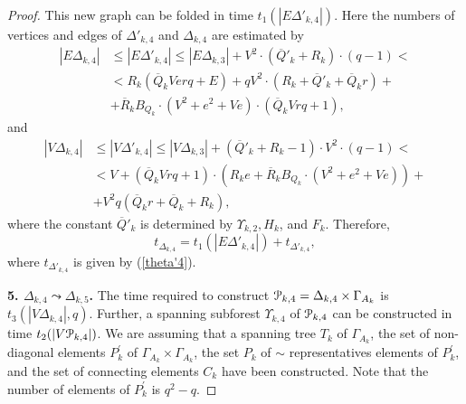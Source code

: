 \documentclass[a4paper,12pt]{article}
\newcommand{\G}{\Gamma }
\newcommand{\D}{\Delta }
\newcommand{\U}{\Upsilon }
\newcommand{\cP}{{\cal{P}}}
\numberwithin{equation}{section}
\numberwithin{figure}{section}
\begin{document}
\begin{proof}
This new graph can be folded in time $t_1(|E\D'_{k,4}|)$. Here the
numbers of vertices and edges of $\D'_{k,4}$ and $\D_{k,4}$ are estimated
by
\begin{equation}\label{etheta4}
\begin{split}
|E\D_{k,4}| &\le |E\D'_{k,4}| \le |E\D_{k,3}|+ V^2 \cdot (\overline{Q}'_k +
R_k)\cdot(q-1)<\\
&< R_k(\overline{Q}_k V e r q + E) + q V^2\cdot (R_k + \overline{Q}'_k + \overline{Q}_k r) +\\
&+ \overline{R}_k B_{Q_k} \cdot(V^2+ e^2 + Ve)\cdot(\overline{Q}_k
V r q +1),
\end{split}
\end{equation}
and
\begin{equation}\label{vtheta4}
\begin{split}
|V\D_{k,4}| &\le |V \D'_{k,4}| \le |V \D_{k,3}| +(\overline{Q}'_k+R_k-1)\cdot
V^2 \cdot(q-1)<\\
&< V + (\overline{Q}_k V rq +1)\cdot(R_k e +\overline{R}_k B_{Q_k}
\cdot(V^2 + e^2 + V e)) +\\
&+ V^2 q (\overline{Q}_k r +\overline{Q}_k +R_k) ,
\end{split}
\end{equation}
where the constant $\overline{Q}'_k$ is determined by $\U_{k,2}, H_k$, and
$F_k$.
Therefore,
\begin{equation}\label{theta4}
t_{\D_{k,4}} = t_1(|E\D'_{k,4}|) + t_{\D'_{k,4}},
\end{equation}
where $t_{\D'_{k,4}}$ is given by (\ref{theta'4}).

{\bf 5. $\D_{k,4} \leadsto \D_{k,5}$.} The time required to construct
$\cP_{k,4}=\D_{k,4}\times \G_{A_k}$ is $t_3(|V \D_{k,4}|, q)$. Further,
 a spanning subforest $\U_{k,4}$ of $\cP_{k,4}$ can be constructed in time
$t_2(|V\cP_{k,4}|)$. We are assuming that  a spanning tree $T_k$ of
$\G_{A_k}$, the set of non-diagonal elements $P_k^\prime$ of
$\G_{A_k}\times \G_{A_k}$, the set $P_k$ of $\sim$ representatives
elements of $P_k^\prime$, and the set of connecting elements
 $C_k$ have been constructed. Note that the number of elements of $P_k^\prime$ is
$q^2-q$.



\end{proof}
\end{document}
